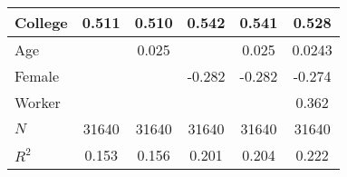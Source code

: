 \begin{tabular}{l*{5}{c}}
\hline\hline
\hline
College   &       0.511&       0.510&       0.542&       0.541&       0.528\\
\hline
Age         &            &      0.025&            &      0.025&      0.0243\\
\hline
Female         &            &            &      -0.282&      -0.282&      -0.274\\
 \hline
Worker     &            &            &            &            &       0.362\\


\hline
\(N\)       &       31640&       31640&       31640&       31640&       31640\\
 \(R^{2}\)&       0.153&       0.156&       0.201&       0.204&       0.222\\
\hline\hline
\end{tabular}
